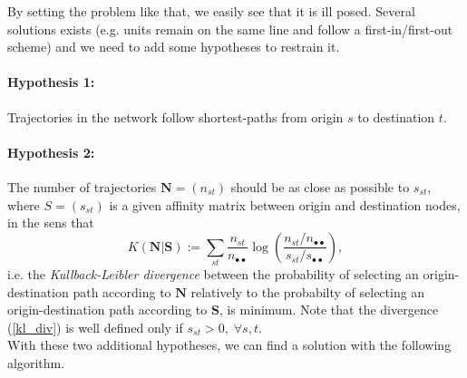 \documentclass[11p]{article}
\begin{document}
By setting the problem like that, we easily see that it is ill posed. Several solutions exists (e.g. units remain on the same line and follow a first-in/first-out scheme) and we need to add some hypotheses to restrain it.

\paragraph{Hypothesis 1:} Trajectories in the network follow shortest-paths from origin $s$ to destination $t$. \\

\paragraph{Hypothesis 2:} The number of trajectories $\mathbf{N} = (n_{st})$ should be as close as possible to $s_{st}$, where $S = (s_{st})$ is a given affinity matrix between origin and destination nodes, in the sens that
\begin{equation}
	K(\mathbf{N} | \mathbf{S}) := \sum_{st} \frac{n_{st}}{n_{\bullet \bullet}} \log \left( \frac{n_{st}/n_{\bullet \bullet}}{s_{st} / s_{\bullet \bullet}} \right), \label{kl_div}
\end{equation}
i.e. the \emph{Kullback-Leibler divergence} between the probability of selecting an origin-destination path according to $\mathbf{N}$ relatively to the probabilty of selecting an origin-destination path according to $\mathbf{S}$, is minimum. Note that the divergence (\ref{kl_div}) is well defined only if $s_{st} > 0, \; \forall s, t$. \\

With these two additional hypotheses, we can find a solution with the following algorithm.
\end{document}

